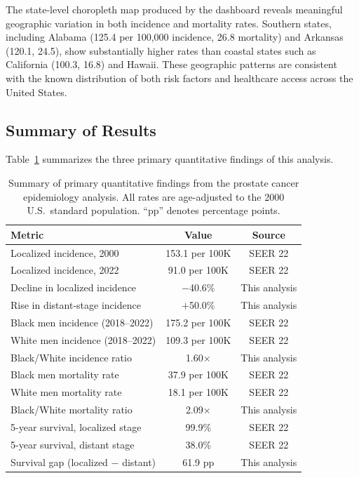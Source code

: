 \documentclass[12pt]{article}
\begin{document}
The state-level choropleth map produced by the dashboard reveals meaningful geographic
variation in both incidence and mortality rates. Southern states, including Alabama
(125.4 per 100,000 incidence, 26.8 mortality) and Arkansas (120.1, 24.5), show
substantially higher rates than coastal states such as California (100.3, 16.8)
and Hawaii. These geographic patterns are consistent with the known distribution of
both risk factors and healthcare access across the United States.

\subsection{Summary of Results}

Table~\ref{tab:summary} summarizes the three primary quantitative findings of this
analysis.

\begin{table}[H]
    \centering
    \begin{tabular}{lcc}
    \toprule
    \textbf{Metric} & \textbf{Value} & \textbf{Source} \\
    \midrule
    Localized incidence, 2000 & 153.1 per 100K & SEER 22 \\
    Localized incidence, 2022 & 91.0 per 100K  & SEER 22 \\
    Decline in localized incidence & $-$40.6\%  & This analysis \\
    Rise in distant-stage incidence & $+$50.0\%  & This analysis \\
    \midrule
    Black men incidence (2018--2022) & 175.2 per 100K & SEER 22 \\
    White men incidence (2018--2022) & 109.3 per 100K & SEER 22 \\
    Black/White incidence ratio & 1.60$\times$ & This analysis \\
    Black men mortality rate & 37.9 per 100K & SEER 22 \\
    White men mortality rate & 18.1 per 100K & SEER 22 \\
    Black/White mortality ratio & 2.09$\times$ & This analysis \\
    \midrule
    5-year survival, localized stage & 99.9\% & SEER 22 \\
    5-year survival, distant stage  & 38.0\% & SEER 22 \\
    Survival gap (localized $-$ distant) & 61.9 pp & This analysis \\
    \bottomrule
    \end{tabular}
    \caption{Summary of primary quantitative findings from the prostate cancer
    epidemiology analysis. All rates are age-adjusted to the 2000 U.S.\ standard
    population. ``pp'' denotes percentage points.}
    \label{tab:summary}
\end{table}
\end{document}
